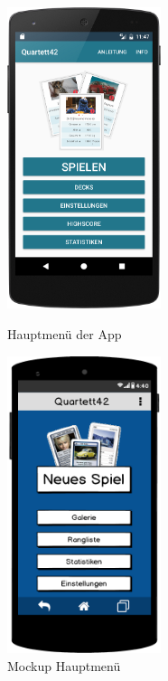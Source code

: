 \begin{figure}[h]
    \centering
    \begin{minipage}{0.49\textwidth}
        \centering
        \includegraphics[width=0.4\textwidth]{img/screenshots/device_main_screen.png}
        \caption{Hauptmenü der App}
		\label{figure:implementierungmenue}
    \end{minipage}
    \begin{minipage}{0.49\textwidth}
        \centering
        \includegraphics[width=0.4\textwidth]{img/mockups/main_screen.png}
        \caption{Mockup Hauptmenü}
    \end{minipage}
\end{figure}

